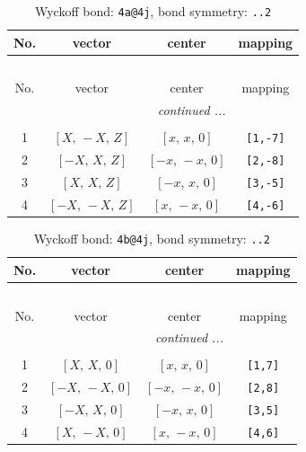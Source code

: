 \documentclass[fleqn,8pt]{jsarticle}
\begin{document}
\begin{longtable}{cccc}
\caption{Wyckoff bond: {\tt 4a@4j}, bond symmetry: {\tt ..2}}
 \\
 \hline \hline
No. & vector & center & mapping \\ \hline \endfirsthead

\multicolumn{3}{l}{\tablename\ \thetable{}} \\
 \hline \hline
No. & vector & center & mapping \\ \hline \endhead

 \hline \hline
\multicolumn{3}{r}{\footnotesize\it continued ...} \\ \endfoot

 \hline \hline
\multicolumn{3}{r}{} \\ \endlastfoot

1 & $\left[ X,\, - X,\, Z \right]$ & $\left[ x,\, x,\, 0 \right]$ & {\tt [1,-7]} \\ \hline
2 & $\left[ - X,\, X,\, Z \right]$ & $\left[ - x,\, - x,\, 0 \right]$ & {\tt [2,-8]} \\ \hline
3 & $\left[ X,\, X,\, Z \right]$ & $\left[ - x,\, x,\, 0 \right]$ & {\tt [3,-5]} \\ \hline
4 & $\left[ - X,\, - X,\, Z \right]$ & $\left[ x,\, - x,\, 0 \right]$ & {\tt [4,-6]} \\
\end{longtable}
\renewcommand{\arraystretch}{1.2}
\begin{longtable}{cccc}
\caption{Wyckoff bond: {\tt 4b@4j}, bond symmetry: {\tt ..2}}
 \\
 \hline \hline
No. & vector & center & mapping \\ \hline \endfirsthead

\multicolumn{3}{l}{\tablename\ \thetable{}} \\
 \hline \hline
No. & vector & center & mapping \\ \hline \endhead

 \hline \hline
\multicolumn{3}{r}{\footnotesize\it continued ...} \\ \endfoot

 \hline \hline
\multicolumn{3}{r}{} \\ \endlastfoot

1 & $\left[ X,\, X,\, 0 \right]$ & $\left[ x,\, x,\, 0 \right]$ & {\tt [1,7]} \\ \hline
2 & $\left[ - X,\, - X,\, 0 \right]$ & $\left[ - x,\, - x,\, 0 \right]$ & {\tt [2,8]} \\ \hline
3 & $\left[ - X,\, X,\, 0 \right]$ & $\left[ - x,\, x,\, 0 \right]$ & {\tt [3,5]} \\ \hline
4 & $\left[ X,\, - X,\, 0 \right]$ & $\left[ x,\, - x,\, 0 \right]$ & {\tt [4,6]} \\
\end{longtable}
\end{document}
